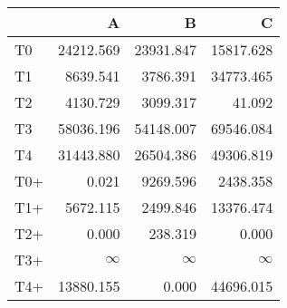 \begin{tabular}{lrrr}
\toprule
     &         A &         B &         C \\
\midrule
 T0  & \num{24212.569} & \num{23931.847} & \num{15817.628} \\
 T1  &  \num{8639.541} &  \num{3786.391} & \num{34773.465} \\
 T2  &  \num{4130.729} &  \num{3099.317} &    \num{41.092} \\
 T3  & \num{58036.196} & \num{54148.007} & \num{69546.084} \\
 T4  & \num{31443.880} & \num{26504.386} & \num{49306.819} \\
 T0+ &     \num{0.021} &  \num{9269.596} &  \num{2438.358} \\
 T1+ &  \num{5672.115} &  \num{2499.846} & \num{13376.474} \\
 T2+ &     \num{0.000} &   \num{238.319} &     \num{0.000} \\
 T3+ &  $\infty$    &  $\infty$    &  $\infty$    \\
 T4+ & \num{13880.155} &     \num{0.000} & \num{44696.015} \\
\bottomrule
\end{tabular}